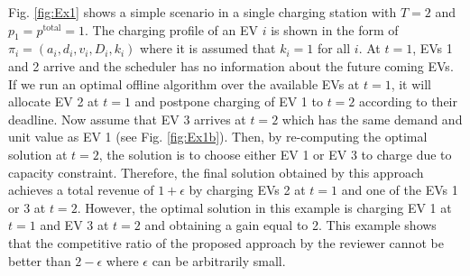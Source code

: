 \documentclass[11pt]{article}
\begin{document}
Fig. \ref{fig:Ex1} shows a simple scenario in a single charging station with $T=2$ and $p_1=p^{\text{total}}=1$. The charging profile of an EV $i$ is shown in the form of $\pi_i=(a_i,d_i,v_i,D_i,k_i)$ where it is assumed that $k_i=1$ for all $i$.
At $t=1$, EVs 1 and 2 arrive and the scheduler has no information about the future coming EVs. If we run an optimal offline algorithm over the available EVs at $t=1$, it will allocate EV 2 at $t=1$ and postpone charging of EV 1 to $t=2$ according to their deadline. Now assume that EV 3 arrives at $t=2$ which has the same demand and unit value as EV 1 (see Fig. \ref{fig:Ex1b}). Then, by re-computing the optimal solution at $t=2$, the solution is to choose either EV 1 or EV 3 to charge due to capacity constraint. Therefore, the final solution obtained by this approach achieves a total revenue of $1+\epsilon$ by charging EVs 2 at $t=1$ and one of the EVs 1 or 3 at $t=2$. However, the optimal solution in this example is charging EV 1 at $t=1$ and EV 3 at $t=2$ and obtaining a gain equal to 2. This example shows that the competitive ratio of the proposed approach by the reviewer cannot be better than $2-\epsilon$ where $\epsilon$ can be arbitrarily small.  
\end{document}

